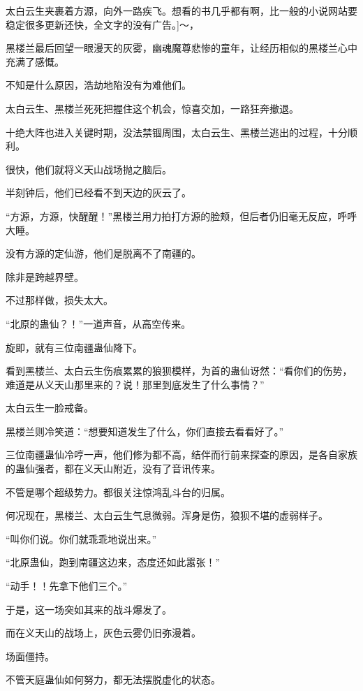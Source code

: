 
\begin{this_body}

太白云生夹裹着方源，向外一路疾飞。想看的书几乎都有啊，比一般的小说网站要稳定很多更新还快，全文字的没有广告。]～，

黑楼兰最后回望一眼漫天的灰雾，幽魂魔尊悲惨的童年，让经历相似的黑楼兰心中充满了感慨。

不知是什么原因，浩劫地陷没有为难他们。

太白云生、黑楼兰死死把握住这个机会，惊喜交加，一路狂奔撤退。

十绝大阵也进入关键时期，没法禁锢周围，太白云生、黑楼兰逃出的过程，十分顺利。

很快，他们就将义天山战场抛之脑后。

半刻钟后，他们已经看不到天边的灰云了。

“方源，方源，快醒醒！”黑楼兰用力拍打方源的脸颊，但后者仍旧毫无反应，呼呼大睡。

没有方源的定仙游，他们是脱离不了南疆的。

除非是跨越界壁。

不过那样做，损失太大。

“北原的蛊仙？！”一道声音，从高空传来。

旋即，就有三位南疆蛊仙降下。

看到黑楼兰、太白云生伤痕累累的狼狈模样，为首的蛊仙讶然：“看你们的伤势，难道是从义天山那里来的？说！那里到底发生了什么事情？”

太白云生一脸戒备。

黑楼兰则冷笑道：“想要知道发生了什么，你们直接去看看好了。”

三位南疆蛊仙冷哼一声，他们修为都不高，结伴而行前来探查的原因，是各自家族的蛊仙强者，都在义天山附近，没有了音讯传来。

不管是哪个超级势力。都很关注惊鸿乱斗台的归属。

何况现在，黑楼兰、太白云生气息微弱。浑身是伤，狼狈不堪的虚弱样子。

“叫你们说。你们就乖乖地说出来。”

“北原蛊仙，跑到南疆这边来，态度还如此嚣张！”

“动手！！先拿下他们三个。”

于是，这一场突如其来的战斗爆发了。

而在义天山的战场上，灰色云雾仍旧弥漫着。

场面僵持。

不管天庭蛊仙如何努力，都无法摆脱虚化的状态。


\end{this_body}
